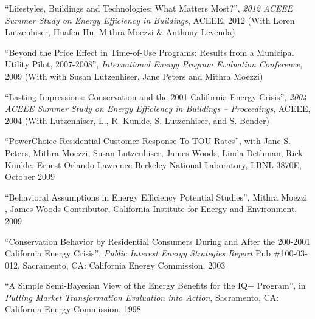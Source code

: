 \documentclass[Computer Science]{vita}
\begin{document}
\begin{vita}
\begin{Selected Publications}
\begin{Papers in Refereed Journals}
    \end{Papers in Refereed Journals}

    \begin{Papers at Refereed Conferences}
    \item ``Lifestyles, Buildings and Technologies: What Matters Most?'', \emph{2012 ACEEE Summer Study
        on Energy Efficiency in Buildings}, ACEEE, 2012 (With Loren Lutzenhiser, Huafen Hu, Mithra Moezzi \& Anthony Levenda)

   \item ``Beyond the Price Effect in Time-of-Use Programs: Results
      from a Municipal Utility Pilot, 2007-2008'', \emph{International
        Energy Program Evaluation Conference}, 2009 (With with Susan
      Lutzenhiser, Jane Peters and Mithra Moezzi)

   \item ``Lasting Impressions: Conservation and the 2001 California
      Energy Crisis'', \emph{2004 ACEEE Summer Study on Energy
        Efficiency in Buildings -- Proceedings}, ACEEE, 2004 (With
      Lutzenhiser, L., R. Kunkle, S. Lutzenhiser, and S. Bender)

    
    
    \end{Papers at Refereed Conferences}
   
    \begin{Unrefereed Public Reports}
    
    \item ``PowerChoice Residential Customer Response To TOU Rates'',
      with Jane S. Peters, Mithra Moezzi, Susan Lutzenhiser, James
      Woods, Linda Dethman, Rick Kunkle, Ernest Orlando Lawrence
      Berkeley National Laboratory, LBNL-3870E, October 2009

    \item ``Behavioral Assumptions in Energy Efficiency Potential
      Studies'', Mithra Moezzi , James Woods Contributor, California
      Institute for Energy and Environment, 2009

    \item ``Conservation Behavior by Residential Consumers During and
      After the 200-2001 California Energy Crisis'', \emph{Public
        Interest Energy Strategies Report} Pub \#100-03-012,
      Sacramento, CA: California Energy Commission, 2003

	
    \item ``A Simple Semi-Bayesian View of the Energy Benefits for the
      IQ+ Program'', in \emph{Putting Market Transformation Evaluation
        into Action}, Sacramento, CA: California Energy Commission,
      1998
	

\end{Unrefereed Public Reports}
\end{Selected Publications}
\end{vita}
\end{document}
